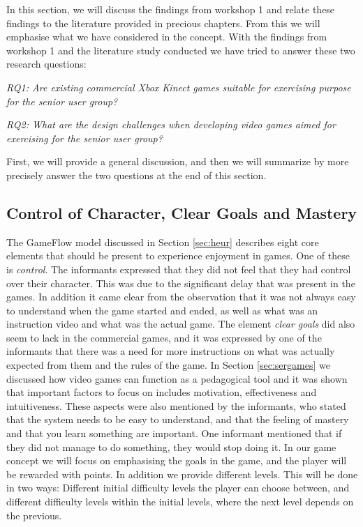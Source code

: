 In this section, we will discuss the findings from workshop 1 and relate these findings to the literature provided in precious chapters. From this we will emphasise what we have considered in the concept. With the findings from workshop 1 and the literature study conducted we have tried to answer these two research questions: 

\emph{RQ1: Are existing commercial Xbox Kinect games suitable for exercising purpose for the senior user group?}

\emph{RQ2: What are the design challenges when developing video games aimed for exercising for the senior user group?}

First, we will provide a general discussion, and then we will summarize by more precisely answer the two questions at the end of this section. 

\subsection{Control of Character, Clear Goals and Mastery}
The GameFlow model \cite{sweetser} discussed in Section \ref{sec:heur} describes eight core elements that should be present to experience enjoyment in games. One of these is \emph{control}. The informants expressed that they did not feel that they had control over their character. This was due to the significant delay that was present in the games. In addition it came clear from the observation that it was not always easy to understand when the game started and ended, as well as what was an instruction video and what was the actual game. The element \emph{clear goals} did also seem to lack in the commercial games, and it was expressed by one of the informants that there was a need for more instructions on what was actually expected from them and the rules of the game. In Section \ref{sec:sergames} we discussed how video games can function as a pedagogical tool and it was shown that important factors to focus on includes motivation, effectiveness and intuitiveness.  These aspects were also mentioned by the informants, who stated that the system needs to be easy to understand, and that the feeling of mastery and that you learn something are important.  One informant mentioned that if they did not manage to do something, they would stop doing it. In our game concept we will focus on emphasising the goals in the game, and the player will be rewarded with points. In addition we provide different levels. This will be done in two ways: Different initial difficulty levels the player can choose between, and different difficulty levels within the initial levels, where the next level depends on the previous.  

